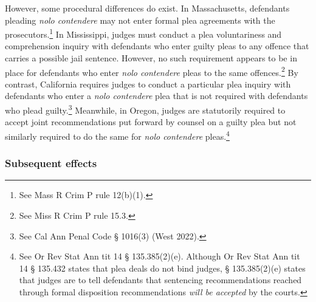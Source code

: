 However, some procedural differences do exist. In Massachusetts, defendants pleading \textit{nolo contendere} may not enter formal plea agreements with the prosecutors.\footnote{See Mass R Crim P rule 12(b)(1).} In Mississippi, judges must conduct a plea voluntariness and comprehension inquiry with defendants who enter guilty pleas to any offence that carries a possible jail sentence. However, no such requirement appears to be in place for defendants who enter \textit{nolo contendere} pleas to the same offences.\footnote{See Miss R Crim P rule 15.3.} By contrast, California requires judges to conduct a particular plea inquiry with defendants who enter a \textit{nolo contendere} plea that is not required with defendants who plead guilty.\footnote{See Cal Ann Penal Code § 1016(3) (West 2022).} Meanwhile, in Oregon, judges are statutorily required to accept joint recommendations put forward by counsel on a guilty plea but not similarly required to do the same for \textit{nolo contendere} pleas.\footnote{See Or Rev Stat Ann tit 14 § 135.385(2)(e). Although Or Rev Stat Ann tit 14 § 135.432 states that plea deals do not bind judges, § 135.385(2)(e) states that judges are to tell defendants that sentencing recommendations reached through formal disposition recommendations \textit{will be accepted} by the courts.} 

\subsubsection{Subsequent effects}

